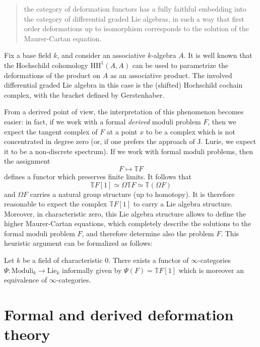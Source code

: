 \begin{refsection}
\begin{quote}
the category of deformation functors has a fully faithful embedding into the category of differential graded Lie algebras, in such a way that first order deformations up to isomorphism corresponds to the solution of the Maurer-Cartan equation.
\end{quote}

\begin{eg}
Fix a base field $k$, and consider an associative $k$-algebra $A$. It is well known that the Hochschild cohomology $\mathrm{HH}^1(A,A)$ can be used to parametrize the deformations of the product on $A$ as an associative product. The involved differential graded Lie algebra in this case is the (shifted) Hochschild cochain complex, with the bracket defined by Gerstenhaber.
\end{eg}

From a derived point of view, the interpretation of this phenomenon becomes easier: in fact, if we work with a formal \emph{derived} moduli problem $F$, then we expect the tangent complex of $F$ at a point $x$ to be a complex which is not concentrated in degree zero (or, if one prefers the approach of J. Lurie, we expect it to be a non-discrete spectrum). If we work with formal moduli problems, then the assignment
\[
F \mapsto \mathbb TF
\]
defines a functor which preserves finite limits. It follows that
\[
\mathbb TF[1] \simeq \Omega \mathbb TF \simeq \mathbb T(\Omega F)
\]
and $\Omega F$ carries a natural group structure (up to homotopy). It is therefore reasonable to expect the complex $\mathbb TF[1]$ to carry a Lie algebra structure. Moreover, in characteristic zero, this Lie algebra structure allows to define the higher Maurer-Cartan equations, which completely describe the solutions to the formal moduli problem $F$, and therefore determine also the problem $F$. This heuristic argument can be formalized as follows:

\begin{thm}
Let $k$ be a field of characteristic $0$. There exists a functor of $\infty$-categories $\Psi \colon \mathrm{Moduli}_k \to \mathrm{Lie}_k$ informally given by $\Psi(F) = \mathbb T F[1]$ which is moreover an equivalence of $\infty$-categories.
\end{thm}

\section{Formal and derived deformation theory}


\end{refsection}
